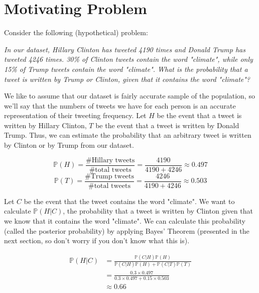 \documentclass[12pt]{article} \usepackage{amsmath,amssymb,amsthm}
\begin{document}
\maketitle
\section{Motivating Problem}
Consider the following (hypothetical) problem: 
\newline 

\textit{In our dataset, Hillary Clinton has tweeted 4190 times and Donald Trump
  has tweeted 4246 times. 30\% of Clinton tweets contain the word "climate",
  while only 15\% of Trump tweets contain the word "climate". What is the
  probability that a tweet is written by Trump or Clinton, given that it
  contains the word "climate"?} 
\newline


We like to assume that our dataset is fairly accurate sample of the population,
so we'll say that the numbers of tweets we have for each person is an accurate
representation of their tweeting frequency. Let $H$ be the event that a tweet is
written by Hillary Clinton, $T$ be the event that a tweet is written by Donald
Trump. Thus, we can estimate the probability that an arbitrary tweet is written
by Clinton or by Trump from our dataset.

$$\mathbb{P}(H) = \frac{\text{\# Hillary tweets}}{\text{\# total tweets}} =
\frac{4190}{4190+4246} \approx 0.497$$
$$\mathbb{P}(T) = \frac{\text{\# Trump tweets}}{\text{\# total tweets}} =
\frac{4246}{4190+4246} \approx 0.503$$

Let $C$ be the event that the tweet contains the word "climate". We want to
calculate $\mathbb{P}(H|C)$, the probability that a tweet is written by Clinton
given that we know that it contains the word "climate". We can calculate this
probability (called the posterior probability) by applying Bayes' Theorem
(presented in the next section, so don't worry if you don't know what this is).

\begin{equation}
\begin{split}
  \mathbb{P}(H|C) &= \frac{\mathbb{P}(C|H)\mathbb{P}(H)}{\mathbb{P}(C|H)\mathbb{P}(H) + \mathbb{P}(C|T)\mathbb{P}(T)}\\
  &= \frac{0.3 \times 0.497}{0.3 \times 0.497 + 0.15 \times 0.503}\\
  &\approx 0.66
\end{split}
\end{equation}
\end{document}
